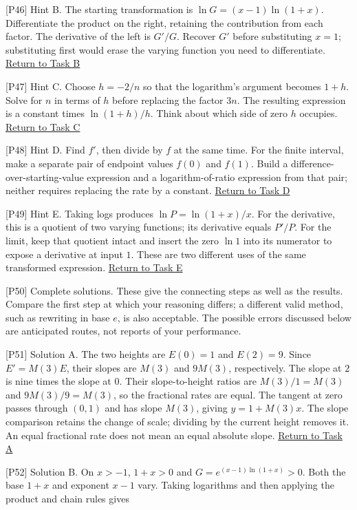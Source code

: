 \documentclass[
  11pt,
]{article}
\providecommand{\gt}{>}
\begin{document}
{[}P46{]} Hint B. The starting transformation is
\(\ln G=(x-1)\ln(1+x)\). Differentiate the product on the right,
retaining the contribution from each factor. The derivative of the left
is \(G'/G\). Recover \(G'\) before substituting \(x=1\); substituting
first would erase the varying function you need to differentiate.
\protect\hyperlink{task-b}{Return to Task B}

{[}P47{]} Hint C. Choose \(h=-2/n\) so that the logarithm's argument
becomes \(1+h\). Solve for \(n\) in terms of \(h\) before replacing the
factor \(3n\). The resulting expression is a constant times
\(\ln(1+h)/h\). Think about which side of zero \(h\) occupies.
\protect\hyperlink{task-c}{Return to Task C}

{[}P48{]} Hint D. Find \(f'\), then divide by \(f\) at the same time.
For the finite interval, make a separate pair of endpoint values
\(f(0)\) and \(f(1)\). Build a difference-over-starting-value expression
and a logarithm-of-ratio expression from that pair; neither requires
replacing the rate by a constant. \protect\hyperlink{task-d}{Return to
Task D}

{[}P49{]} Hint E. Taking logs produces \(\ln P=\ln(1+x)/x\). For the
derivative, this is a quotient of two varying functions; its derivative
equals \(P'/P\). For the limit, keep that quotient intact and insert the
zero \(\ln1\) into its numerator to expose a derivative at input \(1\).
These are two different uses of the same transformed expression.
\protect\hyperlink{task-e}{Return to Task E}

{[}P50{]} Complete solutions. These give the connecting steps as well as
the results. Compare the first step at which your reasoning differs; a
different valid method, such as rewriting in base \(e\), is also
acceptable. The possible errors discussed below are anticipated routes,
not reports of your performance.

{[}P51{]} Solution A. The two heights are \(E(0)=1\) and \(E(2)=9\).
Since \(E'=M(3)E\), their slopes are \(M(3)\) and \(9M(3)\),
respectively. The slope at \(2\) is nine times the slope at \(0\). Their
slope-to-height ratios are \(M(3)/1=M(3)\) and \(9M(3)/9=M(3)\), so the
fractional rates are equal. The tangent at zero passes through \((0,1)\)
and has slope \(M(3)\), giving \(y=1+M(3)x\). The slope comparison
retains the change of scale; dividing by the current height removes it.
An equal fractional rate does not mean an equal absolute slope.
\protect\hyperlink{task-a}{Return to Task A}

{[}P52{]} Solution B. On \(x\gt-1\), \(1+x\gt0\) and
\(G=e^{(x-1)\ln(1+x)}\gt0\). Both the base \(1+x\) and exponent \(x-1\)
vary. Taking logarithms and then applying the product and chain rules
gives
\end{document}
